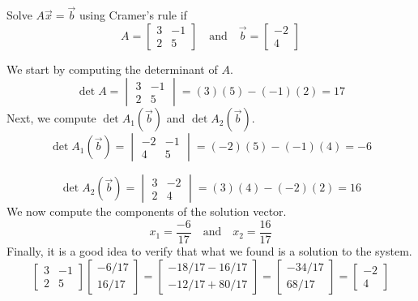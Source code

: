 \documentclass{ximera}
\begin{document}
\begin{example}\label{ex:cramer2by2}
Solve $A\vec{x}=\vec{b}$ using Cramer's rule if
$$A=\begin{bmatrix}3&-1\\2&5\end{bmatrix}\quad\text{and}\quad \vec{b}=\begin{bmatrix}-2\\4\end{bmatrix}$$
 
\begin{explanation}
We start by computing the determinant of $A$.
$$\det{A}=\begin{vmatrix}3&-1\\2&5\end{vmatrix}=(3)(5)-(-1)(2)=17$$
Next, we compute $\det{A_1(\vec{b})}$ and $\det{A_2(\vec{b})}$.
$$\det{A_1(\vec{b})}=\begin{vmatrix}-2&-1\\4&5\end{vmatrix}=(-2)(5)-(-1)(4)=-6$$
 
$$\det{A_2(\vec{b})}=\begin{vmatrix}3&-2\\2&4\end{vmatrix}=(3)(4)-(-2)(2)=16$$
We now compute the components of the solution vector.
$$x_1=\frac{-6}{17}\quad\text{and}\quad x_2=\frac{16}{17}$$
Finally, it is a good idea to verify that what we found is a solution to the system.
$$\begin{bmatrix}3&-1\\2&5\end{bmatrix}\begin{bmatrix}-6/17\\16/17\end{bmatrix}=\begin{bmatrix}-18/17-16/17\\-12/17+80/17\end{bmatrix}=\begin{bmatrix}-34/17\\68/17\end{bmatrix}=\begin{bmatrix}-2\\4\end{bmatrix}$$
\end{explanation}
\end{example}
 
\end{document}
